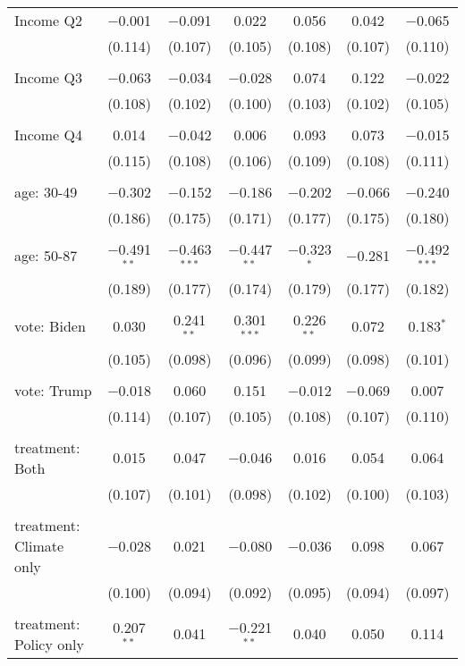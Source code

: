 \begin{tabular}{@{\extracolsep{5pt}}lcccccc}
 Income Q2 & $-$0.001 & $-$0.091 & 0.022 & 0.056 & 0.042 & $-$0.065 \\ 
  & (0.114) & (0.107) & (0.105) & (0.108) & (0.107) & (0.110) \\ 
  & & & & & & \\ 
 Income Q3 & $-$0.063 & $-$0.034 & $-$0.028 & 0.074 & 0.122 & $-$0.022 \\ 
  & (0.108) & (0.102) & (0.100) & (0.103) & (0.102) & (0.105) \\ 
  & & & & & & \\ 
 Income Q4 & 0.014 & $-$0.042 & 0.006 & 0.093 & 0.073 & $-$0.015 \\ 
  & (0.115) & (0.108) & (0.106) & (0.109) & (0.108) & (0.111) \\ 
  & & & & & & \\ 
 age: 30-49 & $-$0.302 & $-$0.152 & $-$0.186 & $-$0.202 & $-$0.066 & $-$0.240 \\ 
  & (0.186) & (0.175) & (0.171) & (0.177) & (0.175) & (0.180) \\ 
  & & & & & & \\ 
 age: 50-87 & $-$0.491$^{**}$ & $-$0.463$^{***}$ & $-$0.447$^{**}$ & $-$0.323$^{*}$ & $-$0.281 & $-$0.492$^{***}$ \\ 
  & (0.189) & (0.177) & (0.174) & (0.179) & (0.177) & (0.182) \\ 
  & & & & & & \\ 
 vote: Biden & 0.030 & 0.241$^{**}$ & 0.301$^{***}$ & 0.226$^{**}$ & 0.072 & 0.183$^{*}$ \\ 
  & (0.105) & (0.098) & (0.096) & (0.099) & (0.098) & (0.101) \\ 
  & & & & & & \\ 
 vote: Trump & $-$0.018 & 0.060 & 0.151 & $-$0.012 & $-$0.069 & 0.007 \\ 
  & (0.114) & (0.107) & (0.105) & (0.108) & (0.107) & (0.110) \\ 
  & & & & & & \\ 
 treatment: Both & 0.015 & 0.047 & $-$0.046 & 0.016 & 0.054 & 0.064 \\ 
  & (0.107) & (0.101) & (0.098) & (0.102) & (0.100) & (0.103) \\ 
  & & & & & & \\ 
 treatment: Climate only & $-$0.028 & 0.021 & $-$0.080 & $-$0.036 & 0.098 & 0.067 \\ 
  & (0.100) & (0.094) & (0.092) & (0.095) & (0.094) & (0.097) \\ 
  & & & & & & \\ 
 treatment: Policy only & 0.207$^{**}$ & 0.041 & $-$0.221$^{**}$ & 0.040 & 0.050 & 0.114 \\ 

\end{tabular}
